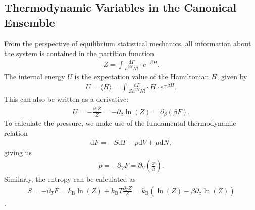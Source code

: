 \documentclass[a4paper,10pt,bibtotoc]{scrartcl}
\begin{document}
\subsection{Thermodynamic Variables in the Canonical Ensemble}
From the perspective of equilibrium statistical mechanics, all information about the system is contained in the partition function 
\begin{align}
 Z = \int\frac{\mathrm{d}\Gamma}{h^{3N}N!}\cdot e^{-\beta H}.
\end{align}
The internal energy $U$ is the expectation value of the Hamiltonian $H$, given by
\begin{align}
 U = \langle H\rangle = \int\frac{\mathrm{d}\Gamma}{Zh^{3N}N!}\cdot H\cdot e^{-\beta H}.
\end{align}
This can also be written as a derivative:
\begin{align}
 U = -\frac{\partial_\beta Z}{Z} =-\partial_\beta\ln\left(Z\right) = \partial_\beta\left(\beta F\right).
\end{align}
To calculate the pressure, we make use of the fundamental thermodynamic relation
\begin{align}
 \mathrm{d}F = -S\mathrm{d}T - p\mathrm{d}V + \mu\mathrm{d}N,
\end{align}
giving us
\begin{align}
p = -\partial_V F = \partial_V\left(\frac{Z}{\beta}\right).
\end{align}
Similarly, the entropy can be calculated as
\begin{align}
 S = -\partial_T F = k_\mathrm{B}\ln\left( Z\right) + k_\mathrm{B}T \frac{\partial_T Z}{Z} = k_\mathrm{B}\left(\ln\left( Z\right)  -\beta \partial_\beta \ln\left(Z\right)\right)
\end{align}.
\end{document}
